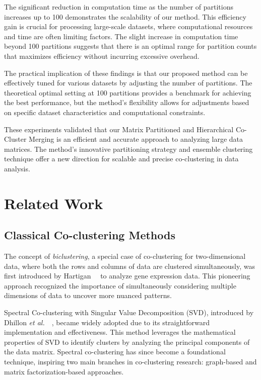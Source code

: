 \documentclass[journal]{IEEEtran}
\renewcommand{\cite}[1]{~\autocite{#1}}
\begin{document}
The significant reduction in computation time as the number of partitions increases up to 100 demonstrates the scalability of our method. This efficiency gain is crucial for processing large-scale datasets, where computational resources and time are often limiting factors. The slight increase in computation time beyond 100 partitions suggests that there is an optimal range for partition counts that maximizes efficiency without incurring excessive overhead.

The practical implication of these findings is that our proposed method can be effectively tuned for various datasets by adjusting the number of partitions. The theoretical optimal setting at 100 partitions provides a benchmark for achieving the best performance, but the method's flexibility allows for adjustments based on specific dataset characteristics and computational constraints.

These experiments validated that our Matrix Partitioned and Hierarchical Co-Cluster Merging is an efficient and accurate approach to analyzing large data matrices. The method's innovative partitioning strategy and ensemble clustering technique offer a new direction for scalable and precise co-clustering in data analysis.


\section{Related Work}
\label{sec:related_work}
\subsection{Classical Co-clustering Methods}
The concept of \emph{biclustering}, a special case of co-clustering for two-dimensional data, where both the rows and columns of data are clustered simultaneously, was first introduced by Hartigan~\cite{hartigan1972DirectClusteringData} to analyze gene expression data. This pioneering approach recognized the importance of simultaneously considering multiple dimensions of data to uncover more nuanced patterns.

Spectral Co-clustering with Singular Value Decomposition (SVD), introduced by Dhillon \textit{et al.}~\cite{dhillon2001CoclusteringDocumentsWords}, became widely adopted due to its straightforward implementation and effectiveness. This method leverages the mathematical properties of SVD to identify clusters by analyzing the principal components of the data matrix. Spectral co-clustering has since become a foundational technique, inspiring two main branches in co-clustering research: graph-based and matrix factorization-based approaches.
\end{document}
